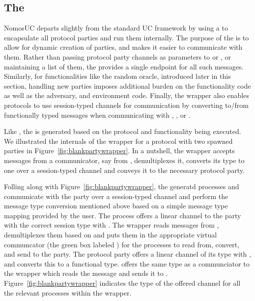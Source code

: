 
\subsection{The \partywrapper}
NomosUC departs slightly from the standard UC framework by using a \partywrapper to encapsulate all protocol parties and run them internally.
The purpose of the \partywrapper is to allow for dynamic creation of parties, and makes it easier to communicate with them.
Rather than passing protocol party channels as parameters to \Z or \A, or maintaining a list of them, the \partywrapper provides a single endpoint for all such messages.
Similarly, for functionalities like the random oracle, introduced later in this section, handling new parties imposes additional burden on the functionality code as well as the adversary, and environment code.
Finally, the wrapper also enables protocols to use session-typed channels for communication by converting to/from functionally typed messages when communicating with \Z, \A, or \F.

Like \iexecuc, the \partywrapper is generated based on the protocol and functionality being executed.
We illustrated the internals of the wrapper for a protocol with two spawned parties in Figure~\ref{fig:blankpartywrapper}.
In a nutshell, the wrapper accepts messages from a communicator, say from \Z, demultiplexes it, converts its type to one over a session-typed channel and conveys it to the necessary protocol party.

Folling along with Figure~\ref{fig:blankpartywrapper}, the generatd processes  and  communicate with the party over a session-typed channel and perform the message type conversion mentioned above based on a simple message type mapping provided by the user.
The  process offers a linear channel to the party with the correct session type with \Z. 
The wrapper reads messages from \Z, demultiplexes them based on  and puts them in the appropriate virtual communcator (the green box labeled ) for the  processes to read from, convert, and send to the party.
The protocol party offers a linear channel of its type with \F, and  converts this to a functional type.  offers the same type as a communciator to the wrapper which reads the message and sends it to \F. 
Figure~\ref{fig:blankpartywrapper} indicates the type of the offered channel for all the relevant processes within the wrapper. 

